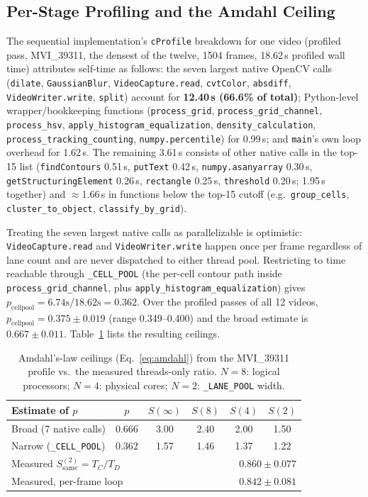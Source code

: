 \documentclass[conference]{IEEEtran}
\newcommand{\code}[1]{\texttt{#1}}
\begin{document}
\subsection{Per-Stage Profiling and the Amdahl Ceiling}
\label{sec:results-amdahl}
The sequential implementation's \code{cProfile} breakdown for one video
(profiled pass, MVI\_39311, the densest of the twelve, 1504 frames,
18.62\,s profiled wall time) attributes self-time as follows: the seven
largest native OpenCV calls (\code{dilate}, \code{GaussianBlur},
\code{VideoCapture.read}, \code{cvtColor}, \code{absdiff},
\code{VideoWriter.write}, \code{split}) account for \textbf{12.40\,s
(66.6\% of total)}; Python-level wrapper/bookkeeping functions
(\code{process\_grid}, \code{process\_grid\_channel}, \code{process\_hsv},
\code{apply\_histogram\_equalization}, \code{density\_calculation},
\code{process\_tracking\_counting}, \code{numpy.percentile}) for 0.99\,s;
and \code{main}'s own loop overhead for 1.62\,s. The remaining 3.61\,s
consists of other native calls in the top-15 list (\code{findContours}
0.51\,s, \code{putText} 0.42\,s, \code{numpy.asanyarray} 0.30\,s,
\code{getStructuringElement} 0.26\,s, \code{rectangle} 0.25\,s,
\code{threshold} 0.20\,s; 1.95\,s together) and $\approx$1.66\,s in
functions below the top-15 cutoff (e.g.\ \code{group\_cells},
\code{cluster\_to\_object}, \code{classify\_by\_grid}).

Treating the seven largest native calls as parallelizable is optimistic:
\code{VideoCapture.read} and \code{VideoWriter.write} happen once per
frame regardless of lane count and are never dispatched to either thread
pool. Restricting to time reachable through \code{\_CELL\_POOL} (the
per-cell contour path inside \code{process\_grid\_channel}, plus
\code{apply\_histogram\_equalization}) gives $p_{\text{cellpool}} =
6.74\text{s}/18.62\text{s} = 0.362$. Over the profiled passes of all 12
videos, $p_{\text{cellpool}} = 0.375\pm0.019$ (range 0.349--0.400) and
the broad estimate is $0.667\pm0.011$. Table~\ref{tab:amdahl} lists the
resulting ceilings.

\begin{table}[t]
\centering
\caption{Amdahl's-law ceilings (Eq.~\eqref{eq:amdahl}) from the
MVI\_39311 profile vs.\ the measured threads-only ratio. $N{=}8$: logical
processors; $N{=}4$: physical cores; $N{=}2$: \code{\_LANE\_POOL} width.}
\label{tab:amdahl}
\footnotesize
\setlength{\tabcolsep}{4pt}
\begin{tabular}{lccccc}
\toprule
\textbf{Estimate of $p$} & \textbf{$p$} & \textbf{$S(\infty)$} & \textbf{$S(8)$} & \textbf{$S(4)$} & \textbf{$S(2)$} \\
\midrule
Broad (7 native calls) & 0.666 & 3.00 & 2.40 & 2.00 & 1.50 \\
Narrow (\code{\_CELL\_POOL}) & 0.362 & 1.57 & 1.46 & 1.37 & 1.22 \\
\midrule
\multicolumn{3}{l}{Measured $S_{\text{same}}^{(2)}=T_C/T_D$} & \multicolumn{3}{r}{$0.860 \pm 0.077$} \\
\multicolumn{3}{l}{Measured, per-frame loop} & \multicolumn{3}{r}{$0.842 \pm 0.081$} \\
\bottomrule
\end{tabular}
\end{table}
\end{document}

